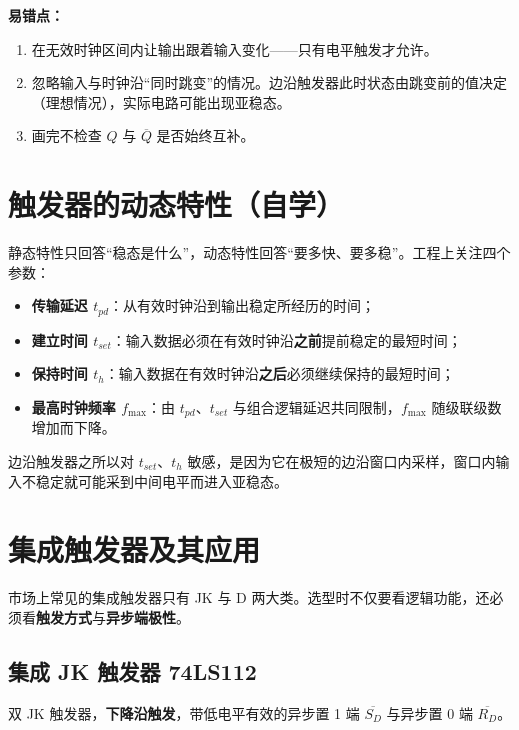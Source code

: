 \noindent\textbf{易错点：}
\begin{enumerate}
    \item 在无效时钟区间内让输出跟着输入变化——只有电平触发才允许。
    \item 忽略输入与时钟沿“同时跳变”的情况。边沿触发器此时状态由跳变前的值决定（理想情况），实际电路可能出现亚稳态。
    \item 画完不检查 $Q$ 与 $\overline{Q}$ 是否始终互补。
\end{enumerate}

\section{触发器的动态特性（自学）}
静态特性只回答“稳态是什么”，动态特性回答“要多快、要多稳”。工程上关注四个参数：
\begin{itemize}
    \item \textbf{传输延迟 $t_{pd}$}：从有效时钟沿到输出稳定所经历的时间；
    \item \textbf{建立时间 $t_{set}$}：输入数据必须在有效时钟沿\textbf{之前}提前稳定的最短时间；
    \item \textbf{保持时间 $t_h$}：输入数据在有效时钟沿\textbf{之后}必须继续保持的最短时间；
    \item \textbf{最高时钟频率 $f_{\max}$}：由 $t_{pd}$、$t_{set}$ 与组合逻辑延迟共同限制，$f_{\max}$ 随级联级数增加而下降。
\end{itemize}
边沿触发器之所以对 $t_{set}$、$t_h$ 敏感，是因为它在极短的边沿窗口内采样，窗口内输入不稳定就可能采到中间电平而进入亚稳态。

\section{集成触发器及其应用}
市场上常见的集成触发器只有 JK 与 D 两大类。选型时不仅要看逻辑功能，还必须看\textbf{触发方式}与\textbf{异步端极性}。

\subsection{集成 JK 触发器 74LS112}
双 JK 触发器，\textbf{下降沿触发}，带低电平有效的异步置 1 端 $\overline{S_D}$ 与异步置 0 端 $\overline{R_D}$。

